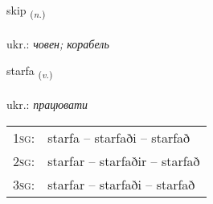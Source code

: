 \documentclass[frontgrid, backgrid]{flacards}\usepackage[]{graphicx}\usepackage[]{xcolor}
\begin{document}
{skip \small{\textsubscript{(\textit{n.})}} \\[1ex] %
\textphonetic{[scɪːp]} \\
ukr.: \emph{човен; корабель} \\  [2ex]
\renewcommand*{\arraystretch}{0.8}
}

\renewcommand{\flhead}{\vskip5pt \fboxsep=0pt {\small\bfseries\footnotesize Sagnorð | дієслово}}
\renewcommand{\fcfoot}{\vskip5pt \fboxsep=0pt \hspace{2pt}{\small\bfseries\footnotesize 1K}}

\renewcommand{\blhead}{\vskip5pt {\small\bfseries\footnotesize Sagnorð | дієслово }}
\renewcommand{\bcfoot}{\vskip5pt \hspace{2pt}{\small\bfseries\footnotesize 1K}}


{starfa \small{\textsubscript{(\textit{v.})}} \\[1ex] %
\textphonetic{[starva]} \\
ukr.: \emph{працювати} \\  [2ex]
\renewcommand*{\arraystretch}{0.8}
\begin{tabular}{p{1cm}l}
\textsc{1sg}: & starfa -- starfaði -- starfað \\ 
\textsc{2sg}: & starfar -- starfaðir -- starfað \\ 
\textsc{3sg}: & starfar -- starfaði -- starfað \\ 
\end{tabular}
}

\renewcommand{\flhead}{\vskip5pt \fboxsep=0pt {\small\bfseries\footnotesize Nafnorð | іменник}}
\renewcommand{\fcfoot}{\vskip5pt \fboxsep=0pt \hspace{2pt}{\small\bfseries\footnotesize 1K}}
\end{document}
